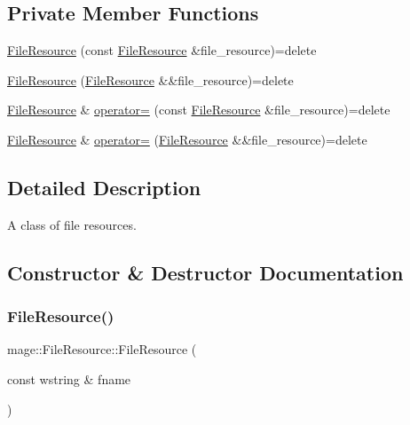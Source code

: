 \subsection*{Private Member Functions}
\begin{DoxyCompactItemize}
\item 
\hyperlink{classmage_1_1_file_resource_a5aa20ee42fcfc4ee6877438ed7377930}{File\+Resource} (const \hyperlink{classmage_1_1_file_resource}{File\+Resource} \&file\+\_\+resource)=delete
\item 
\hyperlink{classmage_1_1_file_resource_a18b14768cb233c20ae191bf0ad8ed2db}{File\+Resource} (\hyperlink{classmage_1_1_file_resource}{File\+Resource} \&\&file\+\_\+resource)=delete
\item 
\hyperlink{classmage_1_1_file_resource}{File\+Resource} \& \hyperlink{classmage_1_1_file_resource_a195da42fa3a40991e7c38cf8305b0bf2}{operator=} (const \hyperlink{classmage_1_1_file_resource}{File\+Resource} \&file\+\_\+resource)=delete
\item 
\hyperlink{classmage_1_1_file_resource}{File\+Resource} \& \hyperlink{classmage_1_1_file_resource_a7ec207d6e9cb0bc4b8020aa73df986b6}{operator=} (\hyperlink{classmage_1_1_file_resource}{File\+Resource} \&\&file\+\_\+resource)=delete
\end{DoxyCompactItemize}


\subsection{Detailed Description}
A class of file resources. 

\subsection{Constructor \& Destructor Documentation}
\hypertarget{classmage_1_1_file_resource_ab126d9301d81c55b2aaacff86437e2d4}{}\label{classmage_1_1_file_resource_ab126d9301d81c55b2aaacff86437e2d4} 
\subsubsection{\texorpdfstring{File\+Resource()}{FileResource()}\hspace{0.1cm}{\footnotesize\ttfamily [1/3]}}
{\footnotesize\ttfamily mage\+::\+File\+Resource\+::\+File\+Resource (\begin{DoxyParamCaption}\item[{const wstring \&}]{fname }\end{DoxyParamCaption})}

